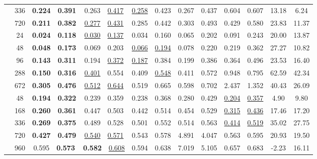 \begin{table*}[t]
{\begin{tabular}{c|c|c|c|c|c|c|SS|}
         &     336   &   \textbf{0.224}~~\textbf{0.391} &   0.263~~\underline{0.417}  &   \underline{0.258}~~0.423  &   0.267~~0.437     &  0.604~~0.607    &   13.18   & 6.24 \\
         &     720   &   \textbf{0.211}~~\textbf{0.382} &   \underline{0.277}~~\underline{0.431}     &   0.285~~0.442    &   0.303~~0.493     &  0.429~~0.580    &   23.83   & 11.37 \\
    \midrule[0.5pt]
         &     24    &   \textbf{0.024}~~\textbf{0.118} &   \underline{0.030}~~\underline{0.137}     &   0.034~~0.160    &   0.065~~0.202    &   0.091~~0.243    &   20.00   & 13.87 \\
         &     48    &   \textbf{0.048}~~\textbf{0.173} &   0.069~~0.203    &   \underline{0.066}~~\underline{0.194}     &   0.078~~0.220    &   0.219~~0.362    &   27.27   & 10.82 \\
         &     96    &   \textbf{0.143}~~\textbf{0.311} &   0.194~~\underline{0.372}  &   \underline{0.187}~~0.384  &   0.199~~0.386    &   0.364~~0.496    &   23.53   & 16.40 \\
         &     288   &   \textbf{0.150}~~\textbf{0.316}&    \underline{0.401}~~0.554  &   0.409~~\underline{0.548}  &   0.411~~0.572    &   0.948~~0.795    &   62.59   & 42.34 \\
         &     672   &   \textbf{0.305}~~\textbf{0.476} &   \underline{0.512}~~\underline{0.644}     &   0.519~~0.665    &   0.598~~0.702    &   2.437~~1.352    &   40.43   & 26.09 \\
    \midrule[0.5pt]
         &     48    &   \textbf{0.194}~~\textbf{0.322} &   0.239~~0.359    &   0.238~~0.368    &   0.280~~0.429    &   \underline{0.204}~~\underline{0.357}     &   4.90    & 9.80 \\
         &     168   &   \textbf{0.260}~~\textbf{0.361} &   0.447~~0.503    &   0.442~~0.514    &   0.454~~0.529    &   \underline{0.315}~~\underline{0.436}     &   17.46   & 17.20 \\
         &     336   &   \textbf{0.269}~~\textbf{0.375} &   0.489~~0.528    &   0.501~~0.552    &   0.514~~0.563    &   \underline{0.414}~~\underline{0.519}     &   35.02   & 27.75 \\
         &     720   &   \textbf{0.427}~~\textbf{0.479} &   \underline{0.540}~~\underline{0.571}     &   0.543~~0.578    &   4.891~~4.047    &   0.563~~0.595    &   20.93   & 19.50 \\
         &     960   &   0.595~~\textbf{0.573} &  \textbf{0.582}~~\underline{0.608}   &   0.594~~0.638    &   7.019~~5.105    &   0.657~~0.683    &   -2.23   & 16.11 \\

\end{tabular}}
\end{table*}
